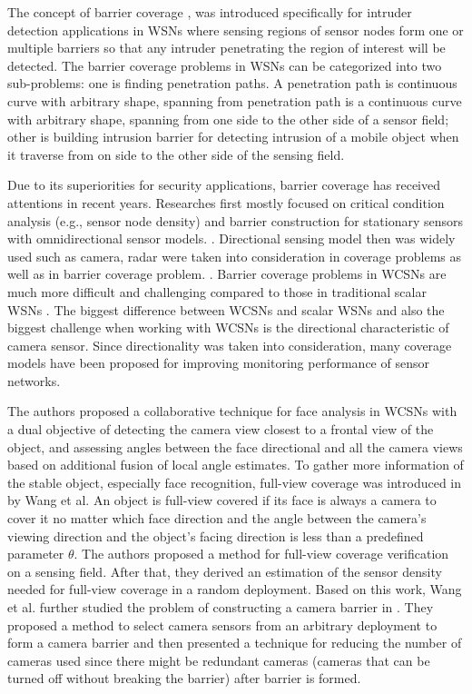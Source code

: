 The concept of barrier coverage \cite{kumar2005barrier}, was introduced specifically for intruder detection applications in WSNs where sensing regions of sensor nodes form one or multiple barriers so that any intruder penetrating the region of interest will be detected. The barrier coverage problems in WSNs can be categorized into two sub-problems: one is finding penetration paths. A penetration path is continuous curve with arbitrary shape, spanning from  penetration path is a continuous curve with arbitrary shape, spanning from one side to the other side of a sensor field; other is building intrusion barrier for detecting intrusion of a mobile object when it traverse from on side to the other side of the sensing field.

Due to its superiorities for security applications, barrier coverage has received attentions in recent years. Researches first mostly focused on critical condition analysis (e.g., sensor node density) and barrier construction for stationary sensors with omnidirectional sensor models. \cite{liu2008strong,saipulla2008barrier,he2010distributed,skraba2007energy,chen2013energy}. Directional sensing model then was widely used such as camera, radar were taken into consideration in coverage problems as well as in barrier coverage problem.
 \cite{ai2006coverage,akyildiz2007survey,guvensan2011coverage,ma2005coverage,soro2005coverage}. Barrier coverage problems in WCSNs are much more difficult and challenging compared to those in traditional scalar WSNs \cite{chang2006collaborative,ma2012minimum,makhoul2009adaptive,wang2011barrier}. The biggest difference between WCSNs and scalar WSNs and also the biggest challenge when working with WCSNs is the directional characteristic of camera sensor. Since directionality was taken into consideration, many coverage models have been proposed for improving monitoring performance of sensor networks. \par
 The authors \cite{chang2006collaborative} proposed a collaborative technique for face
 analysis in WCSNs with a dual objective of
 detecting the camera view closest to a frontal view of the
 object, and assessing angles between the face directional and all the camera views based on additional fusion of local angle estimates. To gather more information of the stable object, especially face recognition, full-view coverage was introduced in \cite{wang2013achieving} by Wang et al. An object is full-view covered if its face is always a camera to cover it no matter which face direction and the angle between the camera’s viewing direction and the object’s facing direction is less than a predefined parameter $\theta$. The authors proposed a method for full-view coverage verification on a sensing field. After that, they derived an estimation of the sensor density needed for full-view coverage in a random deployment. Based on this work, Wang et al. further studied the problem of constructing a camera barrier in \cite{wang2011barrier}. They proposed a method to select camera sensors from an arbitrary deployment to form a camera barrier and then presented a technique for reducing the number of cameras used since there might be redundant cameras (cameras that can be turned off without breaking the barrier) after barrier is formed.
